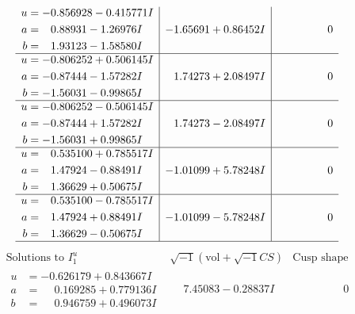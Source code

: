 \documentclass[1p]{elsarticle_modified}
\theoremstyle{definition}
\newcommand{\I}{\sqrt{-1}}
\begin{document}
$$\begin{array}{c|c|c}
\begin{aligned}
u &= -0.856928 - 0.415771 I \\
a &= \phantom{-}0.88931 - 1.26976 I \\
b &= \phantom{-}1.93123 - 1.58580 I\end{aligned}
 & -1.65691 + 0.86452 I & \phantom{-0.000000 } 0 \\ \hline\begin{aligned}
u &= -0.806252 + 0.506145 I \\
a &= -0.87444 - 1.57282 I \\
b &= -1.56031 - 0.99865 I\end{aligned}
 & \phantom{-}1.74273 + 2.08497 I & \phantom{-0.000000 } 0 \\ \hline\begin{aligned}
u &= -0.806252 - 0.506145 I \\
a &= -0.87444 + 1.57282 I \\
b &= -1.56031 + 0.99865 I\end{aligned}
 & \phantom{-}1.74273 - 2.08497 I & \phantom{-0.000000 } 0 \\ \hline\begin{aligned}
u &= \phantom{-}0.535100 + 0.785517 I \\
a &= \phantom{-}1.47924 - 0.88491 I \\
b &= \phantom{-}1.36629 + 0.50675 I\end{aligned}
 & -1.01099 + 5.78248 I & \phantom{-0.000000 } 0 \\ \hline\begin{aligned}
u &= \phantom{-}0.535100 - 0.785517 I \\
a &= \phantom{-}1.47924 + 0.88491 I \\
b &= \phantom{-}1.36629 - 0.50675 I\end{aligned}
 & -1.01099 - 5.78248 I & \phantom{-0.000000 } 0\\
 \hline 
 \end{array}$$\newpage$$\begin{array}{c|c|c}  
\text{Solutions to }I^u_{1}& \I (\text{vol} + \sqrt{-1}CS) & \text{Cusp shape}\\
 \hline 
\begin{aligned}
u &= -0.626179 + 0.843667 I \\
a &= \phantom{-}0.169285 + 0.779136 I \\
b &= \phantom{-}0.946759 + 0.496073 I\end{aligned}
 & \phantom{-}7.45083 - 0.28837 I & \phantom{-0.000000 } 0 \\ \hline\begin{aligned}

\end{aligned}
\end{array}$$
\end{document}

